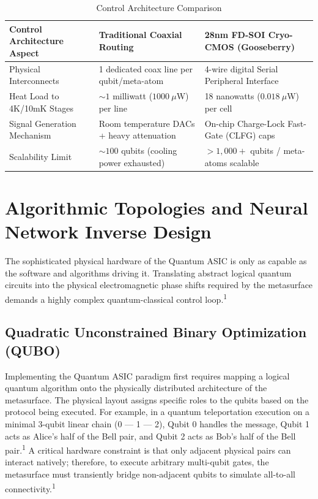 \documentclass[11pt, a4paper]{article}
\begin{document}
\begin{table}[h]
\centering
\renewcommand{\arraystretch}{1.3}
\begin{tabular}{p{} p{} p{}}
\toprule
\textbf{Control Architecture Aspect} & \textbf{Traditional Coaxial Routing} & \textbf{28nm FD-SOI Cryo-CMOS (Gooseberry)} \\
\midrule
Physical Interconnects & 1 dedicated coax line per qubit/meta-atom & 4-wire digital Serial Peripheral Interface \\
Heat Load to 4K/10mK Stages & $\sim 1$ milliwatt ($1000~\mu$W) per line & 18 nanowatts ($0.018~\mu$W) per cell \\
Signal Generation Mechanism & Room temperature DACs + heavy attenuation & On-chip Charge-Lock Fast-Gate (CLFG) caps \\
Scalability Limit & $\sim 100$ qubits (cooling power exhausted) & $> 1,000+$ qubits / meta-atoms scalable \\
\bottomrule
\end{tabular}
\caption{Control Architecture Comparison}
\end{table}

\section*{Algorithmic Topologies and Neural Network Inverse Design}

The sophisticated physical hardware of the Quantum ASIC is only as capable as the software and algorithms driving it. Translating abstract logical quantum circuits into the physical electromagnetic phase shifts required by the metasurface demands a highly complex quantum-classical control loop.\textsuperscript{1}

\subsection*{Quadratic Unconstrained Binary Optimization (QUBO)}

Implementing the Quantum ASIC paradigm first requires mapping a logical quantum algorithm onto the physically distributed architecture of the metasurface. The physical layout assigns specific roles to the qubits based on the protocol being executed. For example, in a quantum teleportation execution on a minimal 3-qubit linear chain (0 --- 1 --- 2), Qubit 0 handles the message, Qubit 1 acts as Alice's half of the Bell pair, and Qubit 2 acts as Bob's half of the Bell pair.\textsuperscript{1} A critical hardware constraint is that only adjacent physical pairs can interact natively; therefore, to execute arbitrary multi-qubit gates, the metasurface must transiently bridge non-adjacent qubits to simulate all-to-all connectivity.\textsuperscript{1}
\end{document}
